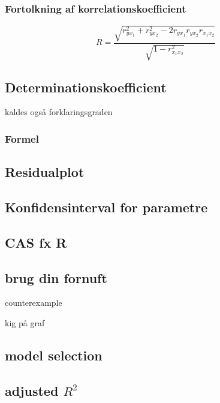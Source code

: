 \subsubsection{Fortolkning af korrelationskoefficient}

\begin{displaymath}
  R = \frac{\sqrt{r^2_{yx_1} + r^2_{yx_2} - 2r_{yx_1} r_{yx_2} r_{{x_1}x_2}}}{\sqrt{1 - r^2_{{x_1}x_2}}}
\end{displaymath}

\subsection{Determinationskoefficient}

kaldes også forklaringsgraden

\subsubsection{Formel}


\subsection{Residualplot}


\subsection{Konfidensinterval for parametre}


\subsection{CAS fx R}

\subsection{brug din fornuft}
counterexample

kig på graf

\subsection{model selection}

\subsection{adjusted \(R^2\)}
